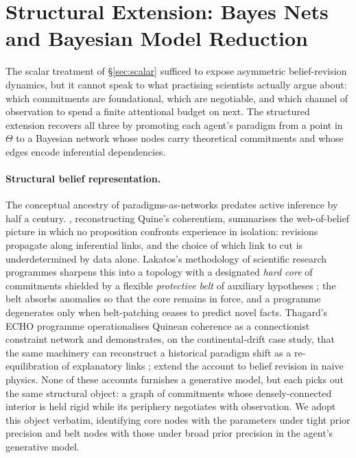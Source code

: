 \section{Structural Extension: Bayes Nets and Bayesian Model Reduction}
\label{sec:structural}

The scalar treatment of \S\ref{sec:scalar} sufficed to expose
asymmetric belief-revision dynamics, but it cannot speak to what
practising scientists actually argue about: which commitments are
foundational, which are negotiable, and which channel of observation
to spend a finite attentional budget on next. The structured extension
recovers all three by promoting each agent's paradigm from a point in
$\Theta$ to a Bayesian network whose nodes carry theoretical
commitments and whose edges encode inferential dependencies.

\paragraph{Structural belief representation.}
The conceptual ancestry of paradigms-as-networks predates active
inference by half a century. \citet{Wahyudi2026_2}, reconstructing
Quine's coherentism, summarises the web-of-belief picture in which no
proposition confronts experience in isolation: revisions propagate
along inferential links, and the choice of which link to cut is
underdetermined by data alone. Lakatos's methodology of scientific
research programmes sharpens this into a topology with a designated
\emph{hard core} of commitments shielded by a flexible
\emph{protective belt} of auxiliary hypotheses
\citep{Heijdra1986_6,Ostapiuk2025_11}; the belt absorbs anomalies so
that the core remains in force, and a programme degenerates only when
belt-patching ceases to predict novel facts. Thagard's ECHO programme
operationalises Quinean coherence as a connectionist constraint
network and demonstrates, on the continental-drift case study, that
the same machinery can reconstruct a historical paradigm shift as a
re-equilibration of explanatory links
\citep{Thagard1989_1,Thagard1988_4}; \citet{Ranney1988_3} extend the
account to belief revision in naive physics. None of these accounts
furnishes a generative model, but each picks out the same structural
object: a graph of commitments whose densely-connected interior is
held rigid while its periphery negotiates with observation. We adopt
this object verbatim, identifying core nodes with the parameters
under tight prior precision and belt nodes with those under broad
prior precision in the agent's generative model.

